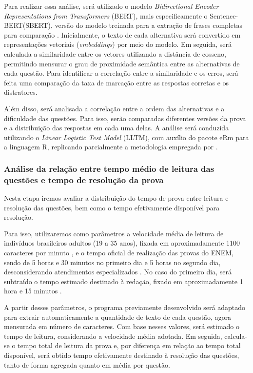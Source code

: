 \documentclass[a4paper,10pt, twocolumn]{article}
\begin{document}
Para realizar essa análise, será utilizado o modelo \textit{Bidirectional Encoder Representations from Transformers} (BERT), mais especificamente o Sentence-BERT(SBERT), versão do modelo treinada para a extração de frases completas para comparação \cite{reimers_sentence-bert_2019}. Inicialmente, o texto de cada alternativa será convertido em representações vetoriais (\textit{embeddings}) por meio do modelo. Em seguida, será calculada a similaridade entre os vetores utilizando a distância de cosseno, permitindo mensurar o grau de proximidade semântica entre as alternativas de cada questão. Para identificar a correlação entre a similaridade e os erros, será feita uma comparação da taxa de marcação entre as respostas corretas e os distratores.

Além disso, será analisada a correlação entre a ordem das alternativas e a dificuldade das questões. Para isso, serão comparadas diferentes versões da prova e a distribuição das respostas em cada uma delas. A análise será conduzida utilizando o \textit{Linear Logistic Test Model} (LLTM), com auxílio do pacote eRm para a linguagem R, replicando parcialmente a metodologia empregada por \textcite{hohensinn_does_nodate}.

\subsubsection{Análise da relação entre tempo médio de leitura das questões e tempo de resolução da prova}

Nesta etapa iremos avaliar a distribuição do tempo de prova entre leitura e resolução das questões, bem como o tempo efetivamente disponível para resolução.

Para isso, utilizaremos como parâmetros a velocidade média de leitura de indivíduos brasileiros adultos (19 a 35 anos), fixada em aproximadamente 1100 caracteres por minuto \cite{Messias2008}, e o tempo oficial de realização das provas do ENEM, sendo de 5 horas e 30 minutos no primeiro dia e 5 horas no segundo dia, desconsiderando atendimentos especializados \cite{inep_enem_servico}. No caso do primeiro dia, será subtraído o tempo estimado destinado à redação, fixado em aproximadamente 1 hora e 15 minutos \cite{brasil_escola_redacao_enem}.

A partir desses parâmetros, o programa previamente desenvolvido será adaptado para extrair automaticamente a quantidade de texto de cada questão, agora mensurada em número de caracteres. Com base nesses valores, será estimado o tempo de leitura, considerando a velocidade média adotada. Em seguida, calcula-se o tempo total de leitura da prova e, por diferença em relação ao tempo total disponível, será obtido tempo efetivamente destinado à resolução das questões, tanto de forma agregada quanto em média por questão.
\end{document}

